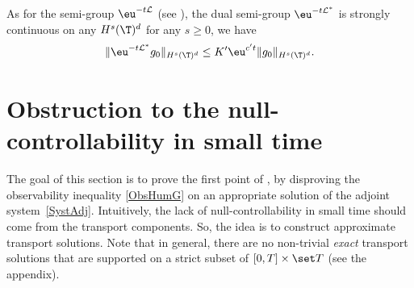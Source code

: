 \begin{remark}\label{rk:semigroup*_Hs}
As for the semi-group $\eu^{-t\mathcal L}$ (see ), the dual semi-group $\eu^{-t\mathcal L^*}$ is strongly continuous on any $H^s(\T)^d$ for any $s\geq 0$, \ie we have
\[
\|\eu^{-t\mathcal L^*} g_0\|_{H^s(\T)^d} \leq K'\eu^{c' t}\|g_0\|_{H^s(\T)^d}.
\]
\end{remark}

\section{Obstruction to the null-controllability in small time} \label{Sec:Obst}

The goal of this section is to prove the first point of , by disproving the observability inequality \eqref{ObsHumG} on an appropriate solution of the adjoint system~\eqref{SystAdj}. Intuitively, the lack of null-controllability in small time should come from the transport components. So, the idea is to construct approximate transport solutions. Note that in general, there are no non-trivial \emph{exact} transport solutions that are supported on a strict subset of $[0,T]\times \set T$ (see the appendix).

